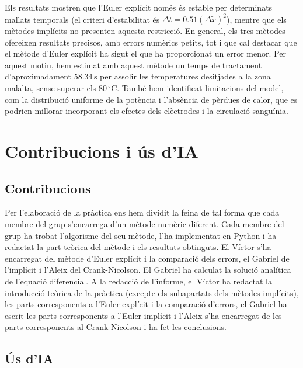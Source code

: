 \documentclass[a4paper,11pt,oneside]{article}
\begin{document}
Els resultats mostren que l'Euler explícit només és estable per determinats mallats temporals (el criteri d'estabilitat és $\Delta \widetilde{t} = 0.51(\Delta \widetilde{x})^2$), 
mentre que els mètodes implícits no presenten aquesta restricció. En general, els tres mètodes ofereixen resultats precisos, amb 
errors numèrics petits, tot i que cal destacar que el mètode d'Euler explícit ha sigut el que ha proporcionat un error menor. 
Per aquest motiu, hem estimat amb aquest mètode un temps de tractament d'aproximadament \(58.34\,\mathrm{s}\) per assolir les 
temperatures desitjades a la zona malalta, sense superar els \(80\,^\circ\mathrm{C}\). També hem identificat limitacions del 
model, com la distribució uniforme de la potència i l'absència de pèrdues de calor, que es podrien millorar incorporant els 
efectes dels elèctrodes i la circulació sanguínia.



\newpage

\section{Contribucions i ús d'IA}

\subsection{Contribucions}

Per l'elaboració de la pràctica ens hem dividit la feina de tal forma que cada membre del grup s'encarrega d'un mètode numèric 
diferent. Cada membre del grup ha trobat l'algorisme del seu mètode, l'ha implementat en Python i ha redactat la part teòrica 
del mètode i els resultats obtinguts. El Víctor s'ha encarregat del mètode d'Euler explícit i la comparació dels errors, 
el Gabriel de l'implícit i l'Aleix del Crank-Nicolson. El Gabriel ha calculat la solució analítica de l'equació diferencial. 
A la redacció de l'informe, el Víctor ha redactat la introducció teòrica de la pràctica (excepte els subapartats dels mètodes 
implícits), les parts corresponents a l'Euler explícit i la comparació d'errors, el Gabriel ha escrit les parts corresponents a 
l'Euler implícit i l'Aleix s'ha encarregat de les parts corresponents al Crank-Nicolson i ha fet les conclusions.



\subsection{Ús d'IA}
\end{document}
